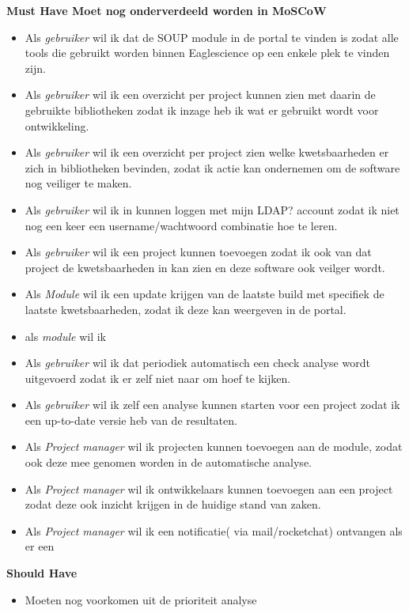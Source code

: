\textbf{Must Have Moet nog onderverdeeld worden in MoSCoW}
\begin{itemize}
  \item Als \textit{gebruiker} wil ik dat de SOUP module in de portal te vinden is zodat alle tools die gebruikt worden binnen Eaglescience op een enkele plek te vinden zijn.
  \item Als \textit{gebruiker} wil ik een overzicht per project kunnen zien met daarin de gebruikte bibliotheken zodat ik inzage heb ik wat er gebruikt wordt voor ontwikkeling.
  \item Als \textit{gebruiker} wil ik een overzicht per project zien welke kwetsbaarheden er zich in bibliotheken bevinden, zodat ik actie kan ondernemen om de software nog veiliger te maken.
  \item Als \textit{gebruiker} wil ik in kunnen loggen met mijn LDAP? account zodat ik niet nog een keer een username/wachtwoord combinatie hoe te leren.
  \item Als \textit{gebruiker} wil ik een project kunnen toevoegen zodat ik ook van dat project de kwetsbaarheden in kan zien en deze software ook veilger wordt.
  \item Als \textit{Module} wil ik een update krijgen van de laatste build met specifiek de laatste kwetsbaarheden, zodat ik deze kan weergeven in de portal.
  \item als \textit{module} wil ik
  \item Als \textit{gebruiker} wil ik dat periodiek automatisch een check analyse wordt uitgevoerd zodat ik er zelf niet naar om hoef te kijken.
  \item Als \textit{gebruiker} wil ik zelf een analyse kunnen starten voor een project zodat ik een up-to-date versie heb van de resultaten.
  \item Als \textit{Project manager} wil ik projecten kunnen toevoegen aan de module, zodat ook deze mee genomen worden in de automatische analyse.
  \item Als \textit{Project manager} wil ik ontwikkelaars kunnen toevoegen aan een project zodat deze ook inzicht krijgen in de huidige stand van zaken.
  \item Als \textit{Project manager} wil ik een notificatie( via mail/rocketchat) ontvangen als er een
\end{itemize}

\textbf{Should Have}
\begin{itemize}
  \item Moeten nog voorkomen uit de prioriteit analyse
\end{itemize}

